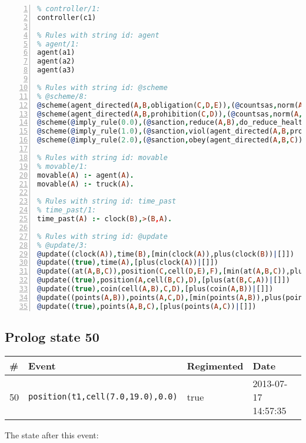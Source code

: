 \documentclass[11pt]{article}\usepackage[utf8]{inputenc}\usepackage{geometry}
\begin{document}
\begin{lstlisting}[language=Prolog, numbers=left]
% Rules with string id: controller
% controller/1:
controller(c1)

% Rules with string id: agent
% agent/1:
agent(a1)
agent(a2)
agent(a3)

% Rules with string id: @scheme
% @scheme/8:
@scheme(agent_directed(A,B,obligation(C,D,E)),(@countsas,norm(A,B,F,obligation(C,D,E)),F),false,(listTrue(C)),(time_past(D)),false,[plus(viol(agent_directed(A,B,obligation(C,D,E))))|[]],[plus(obey(agent_directed(A,B,obligation(C,D,E))))|[]])
@scheme(agent_directed(A,B,prohibition(C,D)),(@countsas,norm(A,B,E,prohibition(C,D)),E),(listTrue(C)),false,(false),false,[plus(viol(agent_directed(A,B,prohibition(C,D))))|[]],[plus(obey(agent_directed(A,B,prohibition(C,D))))|[]])
@scheme(@imply_rule(0.0),(@sanction,reduce(A,B),do_reduce_health(A,B),notifyAgent(A,changed(status))),true,false,false,false,[min(reduce(A,B))|[]],[])
@scheme(@imply_rule(1.0),(@sanction,viol(agent_directed(A,B,prohibition(C,D))),do_sanction(D)),true,false,false,false,[min(viol(agent_directed(A,B,prohibition(C,D))))|[]],[])
@scheme(@imply_rule(2.0),(@sanction,obey(agent_directed(A,B,C))),true,false,false,false,[min(obey(agent_directed(A,B,C)))|[]],[])

% Rules with string id: movable
% movable/1:
movable(A) :- agent(A).
movable(A) :- truck(A).

% Rules with string id: time_past
% time_past/1:
time_past(A) :- clock(B),>(B,A).

% Rules with string id: @update
% @update/3:
@update((clock(A)),time(B),[min(clock(A)),plus(clock(B))|[]])
@update((true),time(A),[plus(clock(A))|[]])
@update((at(A,B,C)),position(C,cell(D,E),F),[min(at(A,B,C)),plus(at(D,E,C))|[]])
@update((true),position(A,cell(B,C),D),[plus(at(B,C,A))|[]])
@update((true),coin(cell(A,B),C,D),[plus(coin(A,B))|[]])
@update((points(A,B)),points(A,C,D),[min(points(A,B)),plus(points(A,D))|[]])
@update((true),points(A,B,C),[plus(points(A,C))|[]])

\end{lstlisting}
\clearpage 
\subsection{Prolog state 50}
\begin{table}[ht]
\centering 
\begin{tabular}{l l l l} 
\textbf{\#} & \textbf{Event} & \textbf{Regimented} & \textbf{Date} \\ [0.5ex] 
\hline
50&\texttt{position(t1,cell(7.0,19.0),0.0)}&true&2013-07-17 14:57:35\\ [1ex] \hline\end{tabular}
\end{table}
The state after this event:
\end{document}
